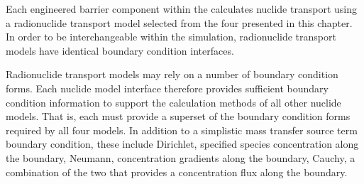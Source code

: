 Each engineered barrier component within the \Cyder calculates 
nuclide transport using a radionuclide transport model selected from the four presented in this 
chapter. In order to be interchangeable within the simulation, radionuclide 
transport models have identical boundary condition interfaces. 

Radionuclide transport models may rely on a number of boundary condition forms.  
Each nuclide model interface therefore provides sufficient boundary condition 
information to support the calculation methods of all other nuclide models. That 
is, each must provide a superset of the boundary condition forms required by all 
four models. In addition to a simplistic mass transfer source term boundary 
condition, these include Dirichlet, specified species concentration along the 
boundary, Neumann, concentration gradients along the boundary, Cauchy, a 
combination of the two that provides a concentration flux along the boundary.
